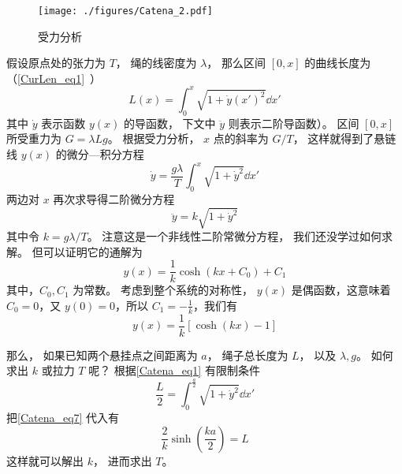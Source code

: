\begin{figure}[ht]
\centering
\texttt{[image: ./figures/Catena\_2.pdf]}
\caption{受力分析} \label{Catena_fig2}
\end{figure}
假设原点处的张力为 $T$， 绳的线密度为 $\lambda$， 那么区间 $[0, x]$ 的曲线长度为（\autoref{CurLen_eq1}~）
\begin{equation}\label{Catena_eq1}
L(x) = \int_0^x \sqrt{1 + \dot y(x')^2} \dd{x'}
\end{equation}
其中 $\dot y$ 表示函数 $y(x)$ 的导函数， 下文中 $\ddot y$ 则表示二阶导函数）。 区间 $[0, x]$ 所受重力为 $G = \lambda L g$。 根据受力分析， $x$ 点的斜率为 $G/T$， 这样就得到了悬链线 $y(x)$ 的微分—积分方程
\begin{equation}
\dot y = \frac{g\lambda}{T} \int_0^x \sqrt{1 + \dot y^2} \dd{x'}
\end{equation}
两边对 $x$ 再次求导得二阶微分方程
\begin{equation}
\ddot y = k \sqrt{1 + \dot y^2}
\end{equation}
其中令 $k = g\lambda/T$。 注意这是一个非线性二阶常微分方程， 我们还没学过如何求解。 但可以证明它的通解为
\begin{equation}\label{Catena_eq2}
y(x) = \frac{1}{k}\cosh(kx+C_0)+C_1
\end{equation}
其中，$C_0,C_1$ 为常数。
考虑到整个系统的对称性， $y(x)$ 是偶函数，这意味着 $C_0=0$，又 $y(0)=0$，所以 $C_1=-\frac{1}{k}$，我们有
\begin{equation}\label{Catena_eq7}
y(x)=\frac{1}{k}[\cosh(kx)-1]
\end{equation}

那么， 如果已知两个悬挂点之间距离为 $a$， 绳子总长度为 $L$， 以及 $\lambda, g$。 如何求出 $k$ 或拉力 $T$ 呢？ 根据\autoref{Catena_eq1} 有限制条件
\begin{equation}
\frac{L}{2} = \int_{0}^{\frac{a}{2}} \sqrt{1 + \dot y^2} \dd{x'}
\end{equation}
把\autoref{Catena_eq7} 代入有
\begin{equation}
\frac{2}{k}\sinh(\frac{ka}{2}) = L
\end{equation}
这样就可以解出 $k$， 进而求出 $T$。

